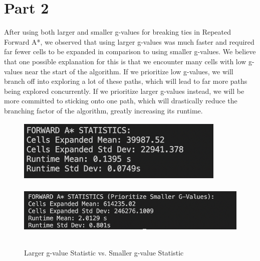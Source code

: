 \documentclass[12pt, letterpaper]{article}
\begin{document}
\section*{Part 2}
After using both larger and smaller g-values for breaking ties in Repeated Forward A*, we observed that using larger g-values was much faster and required far fewer cells to be expanded in comparison to using smaller g-values. We believe that one possible explanation for this is that we encounter many cells with low g-values near the start of the algorithm. If we prioritize low g-values, we will branch off into exploring a lot of these paths, which will lead to far more paths being explored concurrently. If we prioritize larger g-values instead, we will be more committed to sticking onto one path, which will drastically reduce the branching factor of the algorithm, greatly increasing its runtime. 

\begin{figure}[h!]
\centering
\includegraphics[width=10cm, height=3cm]{forwardstat}
\includegraphics[width=15cm, height=3cm]{smallerg}
\caption[margin=0.1cm]{Larger g-value Statistic vs. Smaller g-value Statistic}
\end{figure}
\pagebreak
\end{document}
